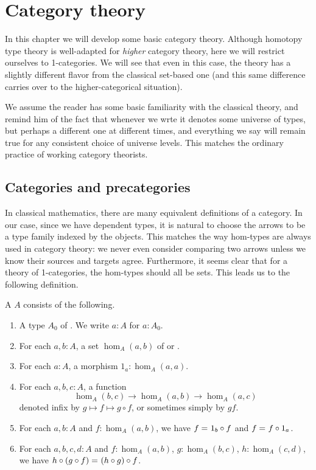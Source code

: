 \chapter{Category theory}
\label{cha:category-theory}

In this chapter we will develop some basic category theory.
Although homotopy type theory is well-adapted for \emph{higher} category theory, here we will restrict ourselves to 1-categories.
We will see that even in this case, the theory has a slightly different flavor from the classical set-based one (and this same difference carries over to the higher-categorical situation).

We assume the reader has some basic familiarity with the classical theory, and remind him of the fact that whenever we wrte \type it denotes some universe of types, but perhaps a different one at different times, and everything we say will remain true for any consistent choice of universe levels.
This matches the ordinary practice of working category theorists.


\section{Categories and precategories}
\label{sec:cats}

In classical mathematics, there are many equivalent definitions of a category.
In our case, since we have dependent types, it is natural to choose the arrows to be a type family indexed by the objects.
This matches the way hom-types are always used in category theory: we never even consider comparing two arrows unless we know their sources and targets agree.
Furthermore, it seems clear that for a theory of 1-categories, the hom-types should all be sets.
This leads us to the following definition.

\begin{defn}\label{ct:precategory}
  A  $A$ consists of the following.
  \begin{enumerate}
  \item A type $A_0$ of .  We write $a:A$ for $a:A_0$.
  \item For each $a,b:A$, a set $\hom_A(a,b)$ of  or .
  \item For each $a:A$, a morphism $1_a:\hom_A(a,a)$.
  \item For each $a,b,c:A$, a function
    \[  \hom_A(b,c) \to \hom_A(a,b) \to \hom_A(a,c) \]
    denoted infix by $g\mapsto f\mapsto g\circ f$, or sometimes simply by $gf$.
  \item For each $a,b:A$ and $f:\hom_A(a,b)$, we have $f =_{} 1_b\circ f$ and $f =_{} f\circ 1_a$.
  \item For each $a,b,c,d:A$ and $f:\hom_A(a,b)$, $g:\hom_A(b,c)$, $h:\hom_A(c,d)$, we have $h\circ (g\circ f) =_{} (h\circ g)\circ f$.
  \end{enumerate}
\end{defn}

